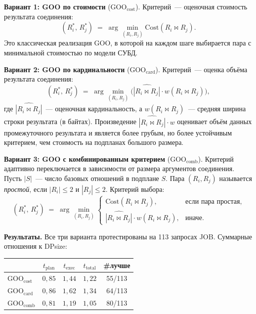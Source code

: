 \textbf{Вариант 1: GOO по стоимости} ($\mathrm{GOO_{cost}}$).
Критерий~--- оценочная стоимость результата соединения:
\[
    (R_i^*,\, R_j^*) \;=\; \arg\min_{(R_i, R_j)} \mathrm{Cost}(R_i \Join R_j).
\]
Это классическая реализация GOO, в которой на каждом шаге выбирается
пара с минимальной стоимостью по модели СУБД.
\par

\textbf{Вариант 2: GOO по кардинальности} ($\mathrm{GOO_{card}}$).
Критерий~--- оценка объёма результата соединения:
\[
    (R_i^*,\, R_j^*) \;=\; \arg\min_{(R_i, R_j)} \bigl(\widehat{|R_i \Join R_j|} \cdot w(R_i \Join R_j)\bigr),
\]
где $\widehat{|R_i \Join R_j|}$~--- оценочная кардинальность, а
$w(R_i \Join R_j)$~--- средняя ширина строки результата (в байтах).
Произведение $\widehat{|R_i \Join R_j|} \cdot w$ оценивает объём данных
промежуточного результата и является более грубым, но более устойчивым
критерием, чем стоимость на подпланах большого размера.
\par

\textbf{Вариант 3: GOO с комбинированным критерием} ($\mathrm{GOO_{comb}}$).
Критерий адаптивно переключается в зависимости от размера аргументов
соединения.
Пусть $|S|$~--- число базовых отношений в подплане $S$.
Пара $(R_i, R_j)$ называется \emph{простой}, если $|R_i| \leqslant 2$ и $|R_j| \leqslant 2$.
Критерий выбора:
\[
    (R_i^*,\, R_j^*) \;=\; \arg\min_{(R_i, R_j)}
    \begin{cases}
        \mathrm{Cost}(R_i \Join R_j), & \text{если пара простая},\\[4pt]
        \widehat{|R_i \Join R_j|} \cdot w(R_i \Join R_j), & \text{иначе}.
    \end{cases}
\]
\par

\textbf{Результаты.}
Все три варианта протестированы на 113 запросах JOB.
Суммарные отношения к DPsize:

\begin{center}
\begin{tabular}{l c c c c}
 & $t_{\mathrm{plan}}$ & $t_{\mathrm{exec}}$ & $t_{\mathrm{total}}$ & \#лучше \\
\hline
$\mathrm{GOO_{cost}}$ & $0{,}85$ & $1{,}44$ & $1{,}22$ & 55/113 \\
$\mathrm{GOO_{card}}$ & $0{,}86$ & $1{,}62$ & $1{,}34$ & 64/113 \\
$\mathrm{GOO_{comb}}$ & $0{,}81$ & $1{,}19$ & $1{,}05$ & 80/113 \\
\end{tabular}
\end{center}

